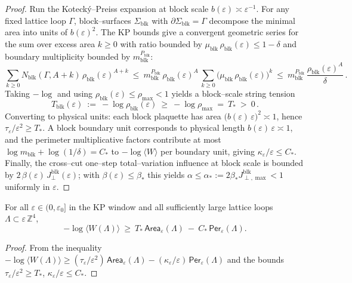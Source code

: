 \documentclass[11pt]{amsart}
\begin{document}
\begin{proof}
Run the Koteck\'y–Preiss expansion at block scale $b(\varepsilon)\asymp \varepsilon^{-1}$. For any fixed lattice loop $\Gamma$, block–surfaces $\Sigma_{\mathrm{blk}}$ with $\partial\Sigma_{\mathrm{blk}}=\Gamma$ decompose the minimal area into units of $b(\varepsilon)^2$. The KP bounds give a convergent geometric series for the sum over excess area $k\ge 0$ with ratio bounded by $\mu_{\mathrm{blk}}\,\rho_{\mathrm{blk}}(\varepsilon)\le 1-\delta$ and boundary multiplicity bounded by $m_{\mathrm{blk}}^{P_{\mathrm{blk}}}$:
\[
  \sum_{k\ge 0} N_{\mathrm{blk}}(\Gamma,A+k)\,\rho_{\mathrm{blk}}(\varepsilon)^{A+k}
  \ \le\ m_{\mathrm{blk}}^{P_{\mathrm{blk}}}\,\rho_{\mathrm{blk}}(\varepsilon)^A\,\sum_{k\ge 0}\bigl(\mu_{\mathrm{blk}}\,\rho_{\mathrm{blk}}(\varepsilon)\bigr)^{k}
  \ \le\ m_{\mathrm{blk}}^{P_{\mathrm{blk}}}\,\frac{\rho_{\mathrm{blk}}(\varepsilon)^A}{\delta}\,.
\]
Taking $-\log$ and using $\rho_{\mathrm{blk}}(\varepsilon)\le \rho_{\max}<1$ yields a block–scale string tension
\[
  T_{\mathrm{blk}}(\varepsilon)\ :=\ -\log \rho_{\mathrm{blk}}(\varepsilon)\ \ge\ -\log \rho_{\max}\ =\ T_*\ >\ 0\,.
\]
Converting to physical units: each block plaquette has area $\bigl(b(\varepsilon)\,\varepsilon\bigr)^2\asymp 1$, hence $\tau_\varepsilon/\varepsilon^2\ge T_*$. A block boundary unit corresponds to physical length $b(\varepsilon)\,\varepsilon\asymp 1$, and the perimeter multiplicative factors contribute at most $\log m_{\mathrm{blk}}+\log(1/\delta)=C_*$ to $-\log\langle W\rangle$ per boundary unit, giving $\kappa_\varepsilon/\varepsilon\le C_*$. Finally, the cross–cut one–step total–variation influence at block scale is bounded by $2\,\beta(\varepsilon)\,J^{\mathrm{blk}}_{\perp}(\varepsilon)$; with $\beta(\varepsilon)\le \beta_*$ this yields $\alpha\le \alpha_*:=2\beta_* J^{\mathrm{blk}}_{\perp,\max}<1$ uniformly in $\varepsilon$.
\end{proof}

\begin{corollary}
For all $\varepsilon\in(0,\varepsilon_0]$ in the KP window and all sufficiently large lattice loops $\Lambda\subset\varepsilon\,\mathbb Z^4$,
\[
  -\log\langle W(\Lambda)\rangle\ \ge\ T_*\,\mathsf{Area}_\varepsilon(\Lambda)\ -\ C_*\,\mathsf{Per}_\varepsilon(\Lambda).
\]
\end{corollary}

\begin{proof}
From the inequality $-\log\langle W(\Lambda)\rangle\ge (\tau_\varepsilon/\varepsilon^2)\,\mathsf{Area}_\varepsilon(\Lambda)-(\kappa_\varepsilon/\varepsilon)\,\mathsf{Per}_\varepsilon(\Lambda)$ and the bounds $\tau_\varepsilon/\varepsilon^2\ge T_*$, $\kappa_\varepsilon/\varepsilon\le C_*$.
\end{proof}
\end{document}
